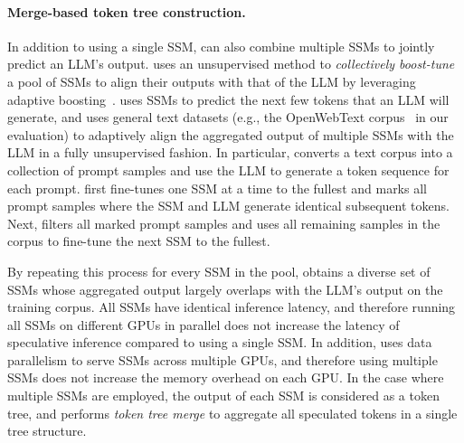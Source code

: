 \paragraph{Merge-based token tree construction.}
In addition to using a single SSM, \sys can also combine multiple SSMs to jointly predict an LLM's output. \Sys uses an unsupervised method to {\em collectively boost-tune} a pool of SSMs to align their outputs with that of the LLM by leveraging adaptive boosting~\cite{freund1999short}.
\Sys uses SSMs to predict the next few tokens that an LLM will generate, and uses general text datasets (e.g., the OpenWebText corpus~\cite{Gokaslan2019OpenWeb} in our evaluation) to adaptively align the aggregated output of multiple SSMs with the LLM in a fully unsupervised fashion.
In particular, \Sys converts a text corpus into a collection of prompt samples and use the LLM to generate a token sequence for each prompt. 
\Sys first fine-tunes one SSM at a time to the fullest and marks all prompt samples where the SSM and LLM generate identical subsequent tokens.
Next, \Sys filters all marked prompt samples and uses all remaining samples in the corpus to fine-tune the next SSM to the fullest. 

By repeating this process for every SSM in the pool, \Sys obtains a diverse set of SSMs whose aggregated output largely overlaps with the LLM's output on the training corpus.
All SSMs have identical inference latency, and therefore running all SSMs on different GPUs in parallel does not increase the latency of speculative inference compared to using a single SSM. 
In addition, \Sys uses data parallelism to serve SSMs across multiple GPUs, and therefore using multiple SSMs does not increase the memory overhead on each GPU.
In the case where multiple SSMs are employed, the output of each SSM is considered as a token tree, and \Sys performs {\em token tree merge} to aggregate all speculated tokens in a single tree structure.

